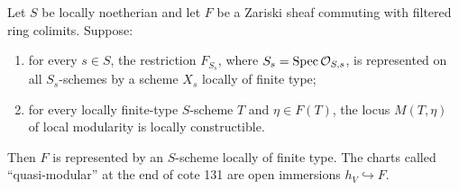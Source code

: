 \begin{theorem}\label{A:local-to-global}
Let $S$ be locally noetherian and let $F$ be a Zariski sheaf commuting
with filtered ring colimits. Suppose:
\begin{enumerate}
\item for every $s\in S$, the restriction $F_{S_s}$, where
$S_s=\operatorname{Spec}\mathcal O_{S,s}$, is represented on all $S_s$-schemes by a
scheme $X_s$ locally of finite type;
\item for every locally finite-type $S$-scheme $T$ and
$\eta\in F(T)$, the locus $M(T,\eta)$ of local modularity is
locally constructible.
\end{enumerate}
Then $F$ is represented by an $S$-scheme locally of finite type.
The charts called ``quasi-modular'' at the end of cote 131 are
open immersions $h_V\hookrightarrow F$.
\end{theorem}
